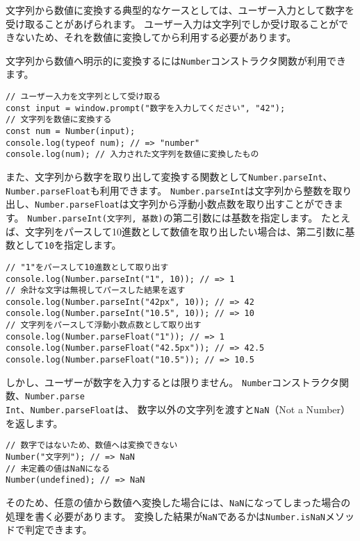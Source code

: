 文字列から数値に変換する典型的なケースとしては、ユーザー入力として数字を受け取ることがあげられます。
ユーザー入力は文字列でしか受け取ることができないため、それを数値に変換してから利用する必要があります。

文字列から数値へ明示的に変換するには\texttt{Number}コンストラクタ関数が利用できます。

\begin{lstlisting}
// ユーザー入力を文字列として受け取る
const input = window.prompt("数字を入力してください", "42");
// 文字列を数値に変換する
const num = Number(input);
console.log(typeof num); // => "number"
console.log(num); // 入力された文字列を数値に変換したもの
\end{lstlisting}

また、文字列から数字を取り出して変換する関数として\texttt{Number.parseInt}、\texttt{Number.parseFloat}も利用できます。
\texttt{Number.parseInt}は文字列から整数を取り出し、\texttt{Number.parseFloat}は文字列から浮動小数点数を取り出すことができます。
\texttt{Number.parseInt(文字列, 基数)}の第二引数には基数を指定します。
たとえば、文字列をパースして10進数として数値を取り出したい場合は、第二引数に基数として\texttt{10}を指定します。

\begin{lstlisting}
// "1"をパースして10進数として取り出す
console.log(Number.parseInt("1", 10)); // => 1
// 余計な文字は無視してパースした結果を返す
console.log(Number.parseInt("42px", 10)); // => 42
console.log(Number.parseInt("10.5", 10)); // => 10
// 文字列をパースして浮動小数点数として取り出す
console.log(Number.parseFloat("1")); // => 1
console.log(Number.parseFloat("42.5px")); // => 42.5
console.log(Number.parseFloat("10.5")); // => 10.5
\end{lstlisting}

しかし、ユーザーが数字を入力するとは限りません。
\texttt{Number}コンストラクタ関数、\texttt{Number.parse\\Int}、\texttt{Number.parseFloat}は、
数字以外の文字列を渡すと\texttt{NaN}（Not a
Number）を返します。

\begin{lstlisting}
// 数字ではないため、数値へは変換できない
Number("文字列"); // => NaN
// 未定義の値はNaNになる
Number(undefined); // => NaN
\end{lstlisting}

\enlargethispage{\baselineskip}そのため、任意の値から数値へ変換した場合には、\texttt{NaN}になってしまった場合の処理を書く必要があります。
変換した結果が\texttt{NaN}であるかは\texttt{Number.isNaN}メソッドで判定できます。

